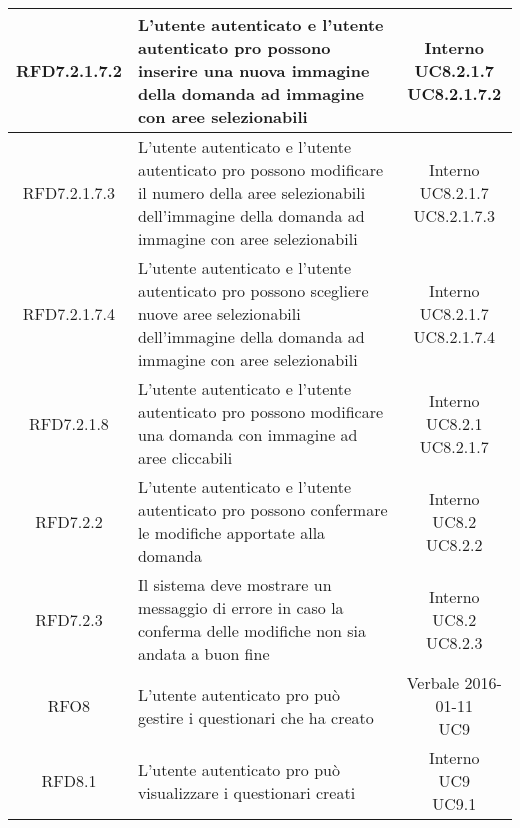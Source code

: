 \begin{longtable}{|c|>{\centering}m{7cm}|c|}
			 \hypertarget{{RFD7.2.1.7.2}}{{RFD7.2.1.7.2}} & L’utente autenticato e l'utente autenticato pro possono inserire una nuova immagine della domanda ad immagine con aree selezionabili & \makecell{Interno\\ UC8.2.1.7 \\UC8.2.1.7.2 } \\ \hline
			 \hypertarget{{RFD7.2.1.7.3}}{{RFD7.2.1.7.3}} & L’utente autenticato e l'utente autenticato pro possono modificare il numero della aree selezionabili dell’immagine della domanda ad immagine con aree selezionabili & \makecell{Interno\\ UC8.2.1.7 \\UC8.2.1.7.3 } \\ \hline
			 \hypertarget{{RFD7.2.1.7.4}}{{RFD7.2.1.7.4}} & L’utente autenticato e l'utente autenticato pro possono scegliere nuove aree selezionabili dell’immagine della domanda ad immagine con aree selezionabili & \makecell{Interno\\ UC8.2.1.7 \\UC8.2.1.7.4 } \\ \hline
			 \hypertarget{{RFD7.2.1.8}}{{RFD7.2.1.8}} & L’utente autenticato e l’utente autenticato pro possono modificare una domanda con immagine ad aree cliccabili & \makecell{Interno\\ UC8.2.1 \\UC8.2.1.7 } \\ \hline
			 \hypertarget{{RFD7.2.2}}{{RFD7.2.2}} & L’utente autenticato e l'utente autenticato pro possono confermare le modifiche apportate alla domanda & \makecell{Interno\\ UC8.2 \\UC8.2.2 } \\ \hline
			 \hypertarget{{RFD7.2.3}}{{RFD7.2.3}} & Il sistema deve mostrare un messaggio di errore in caso la conferma delle modifiche non sia andata a buon fine & \makecell{Interno\\ UC8.2 \\UC8.2.3 } \\ \hline
			 \hypertarget{{RFO8}}{{RFO8}} & L’utente autenticato pro può gestire i questionari che ha creato & \makecell{Verbale 2016-01-11\\ UC9 } \\ \hline
			 \hypertarget{{RFD8.1}}{{RFD8.1}} & L’utente autenticato pro può visualizzare i questionari creati & \makecell{Interno\\ UC9 \\UC9.1 } \\ \hline

\end{longtable}
